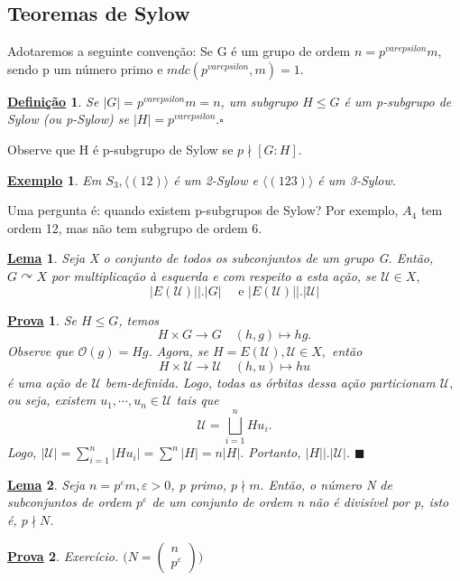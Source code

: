 \documentclass{article}
\newtheorem*{def*}{\underline{Defini\c c\~ao}}
\newtheorem{example*}{\underline{Exemplo}}
\newtheorem*{proof*}{\underline{Prova}}
\newtheorem*{lemma*}{\underline{Lema}}
\renewcommand\qedsymbol{$\blacksquare$}
\begin{document}
\subsection{Teoremas de Sylow}
  Adotaremos a seguinte conven\c cão: Se G é um grupo de ordem \(n=p^{varepsilon}m\),
sendo p um número primo e \(mdc(p^{varepsilon}, m) = 1.\)
\begin{def*}
  Se \(|G| = p^{varepsilon}m = n\), um subgrupo \(H\leq G\) é um p-subgrupo de Sylow (ou p-Sylow) se
 \(|H| = p^{varepsilon}.\square\)
\end{def*}
Observe que H é p-subgrupo de Sylow se \(p\nmid [G:H].\)
\begin{example*}
  Em \(S_{3}, \langle (12) \rangle\) é um 2-Sylow e \(\langle (123) \rangle\) é um 3-Sylow.
\end{example*}
  Uma pergunta é: quando existem p-subgrupos de Sylow? Por exemplo, \(A_{4}\) tem
ordem 12, mas não tem subgrupo de ordem 6.
\begin{lemma*}
  Seja X o conjunto de todos os subconjuntos de um grupo G. Então, \(G \curvearrowright X\) por multiplica\c cão
à esquerda e com respeito a esta a\c cão, se \(\mathcal{U}\in X,\) 
  \[
    |E(\mathcal{U})|\biggl|\biggr.|G|\quad\text{ e } |E(\mathcal{U})|\biggl|\biggr.|\mathcal{U}|
  \]
\end{lemma*}
\begin{proof*}
  Se \(H\leq G\), temos 
    \[
      H\times G\rightarrow G\quad (h, g)\mapsto hg.
    \]
  Observe que \(\mathcal{O}(g) = Hg\). Agora, se \(H = E(\mathcal{U}), \mathcal{U}\in X,\) então 
    \[
      H\times \mathcal{U}\rightarrow \mathcal{U} \quad (h, u)\mapsto hu
    \]
  é uma a\c cão de \(\mathcal{U}\) bem-definida. Logo, todas as órbitas dessa a\c cão particionam \(\mathcal{U},\) ou seja,
existem \(u_{1}, \cdots, u_{n}\in \mathcal{U}\) tais que 
  \[
    \mathcal{U} = \bigsqcup_{i=1}^{n}{Hu_{i}}.
  \]
  Logo, \(|\mathcal{U}| = \sum\limits_{i=1}^{n}|Hu_{i}| = \sum\limits_{}^{n}|H| = n|H|.\)
  Portanto, \(|H|\biggl|\biggr.|\mathcal{U}|.\) \qedsymbol
\end{proof*}
\begin{lemma*}
  Seja \(n=p^{\varepsilon }m, \varepsilon >0\), p primo, \(p\nmid m.\) Então,
  o número N de subconjuntos de ordem \(p^{\varepsilon }\) de um conjunto de ordem n não
  é divisível por p, isto é, \(p\nmid N\). 
\end{lemma*}
\begin{proof*}
  Exercício. \(\biggl(N = \begin{pmatrix}
    n\\
    p^{\varepsilon }
  \end{pmatrix}\biggr)\)
\end{proof*}
\end{document}
